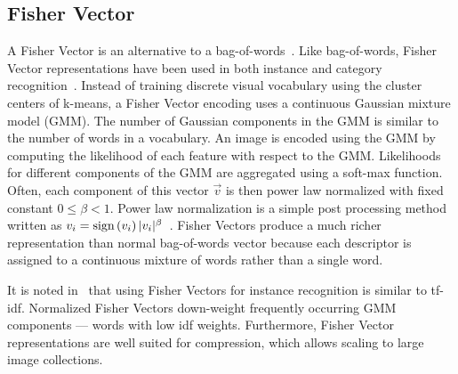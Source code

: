 
    \subsection{Fisher Vector}

        
        A Fisher Vector is an alternative to a
          bag-of-words~\cite{perronnin_largescale_2010-1,
          jegou_aggregating_2010}.
        Like bag-of-words, Fisher Vector representations have been used
          in both instance and category
          recognition~\cite{perronnin_fisher_2007, cinbis_image_2012,
          sun_largescale_2013, sanchez_image_2013, juneja_blocks_2013,
          douze_combining_2011, ma_local_2012, murray_generalized_2014,
          gosselin_revisiting_2014}.
        Instead of training discrete visual vocabulary using the
          cluster centers of k-means, a Fisher Vector encoding uses a
          continuous Gaussian mixture model (GMM).
        The number of Gaussian components in the GMM is  similar to the
          number of words in a vocabulary.
        An image is encoded using the GMM by computing the likelihood
          of each feature with respect to the GMM{}.
        Likelihoods for different components of the GMM are aggregated
          using a soft-max function.
        Often, each component of this vector $\vec{v}$ is then power
          law normalized with fixed constant $0 \leq \beta < 1$.
        Power law normalization is a simple post processing method
          written as $v_i =
          \textrm{sign}\left(v_i\right)|v_i|^\beta$~\cite{jegou_aggregating_2012}.
        Fisher Vectors produce a much richer representation than normal
          bag-of-words vector because each descriptor is assigned to a
          continuous mixture of words rather than a single word.

        It is noted in~\cite{perronnin_largescale_2010-1} that using
          Fisher Vectors for instance recognition is similar to tf-idf.
        Normalized Fisher Vectors down-weight frequently occurring GMM
          components --- \ie{} words with low idf weights.
        Furthermore, Fisher Vector representations are well suited for
          compression, which allows scaling to large image collections.

